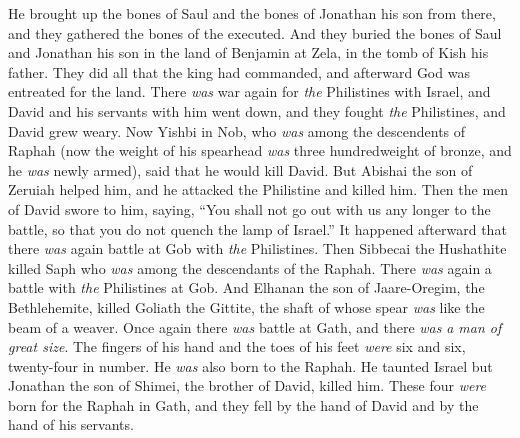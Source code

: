 \begin{biblechapter}
\verse He brought up the bones of Saul and the bones of Jonathan his son from there, and they gathered the bones of the executed.
\verse And they buried the bones of Saul and Jonathan his son in the land of Benjamin at Zela, in the tomb of Kish his father. They did all that the king had commanded, and afterward God was entreated for the land.
 There \textit{was} war again for \textit{the} Philistines with Israel, and David and his servants with him went down, and they fought \textit{the} Philistines, and David grew weary.
\verse Now Yishbi in Nob, who \textit{was} among the descendents of Raphah (now the weight of his spearhead \textit{was} three hundredweight of bronze, and he \textit{was} newly armed), said that he would kill David.
\verse But Abishai the son of Zeruiah helped him, and he attacked the Philistine and killed him. Then the men of David swore to him, saying, “You shall not go out with us any longer to the battle, so that you do not quench the lamp of Israel.”
\verse It happened afterward that there \textit{was} again battle at Gob with \textit{the} Philistines. Then Sibbecai the Hushathite killed Saph who \textit{was} among the descendants of the Raphah.
\verse There \textit{was} again a battle with \textit{the} Philistines at Gob. And Elhanan the son of Jaare-Oregim, the Bethlehemite, killed Goliath the Gittite, the shaft of whose spear \textit{was} like the beam of a weaver.
\verse Once again there \textit{was} battle at Gath, and there \textit{was} \textit{a man of great size}. The fingers of his hand and the toes of his feet \textit{were} six and six, twenty-four in number. He \textit{was} also born to the Raphah.
\verse He taunted Israel but Jonathan the son of Shimei, the brother of David, killed him.
\verse These four \textit{were} born for the Raphah in Gath, and they fell by the hand of David and by the hand of his servants.
\end{biblechapter}

